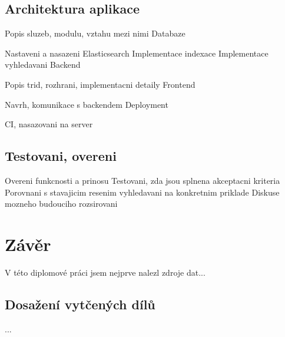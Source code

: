 \documentclass[FM,DP]{tulthesis}
\begin{document}
\section{Architektura aplikace}

Popis sluzeb, modulu, vztahu mezi nimi
Databaze

Nastaveni a nasazeni Elasticsearch
Implementace indexace
Implementace vyhledavani
Backend

Popis trid, rozhrani, implementacni detaily
Frontend

Navrh, komunikace s backendem
Deployment

CI, nasazovani na server

\section{Testovani, overeni}

Overeni funkcnosti a prinosu
Testovani, zda jsou splnena akceptacni kriteria
Porovnani s stavajicim resenim vyhledavani na konkretnim priklade
Diskuse mozneho budouciho rozsirovani




\chapter{Závěr}

V této diplomové práci jsem nejprve nalezl zdroje dat...

\section{Dosažení vytčených dílů}
...
\end{document}

